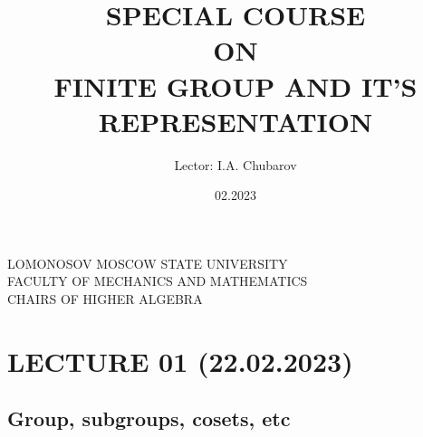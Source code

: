 \documentclass[12pt, a4paper]{article}
\theoremstyle{definition}
\begin{document}
\begin{spacing}{1.5}
\begin{center}
    {\fontsize{14}{16}\selectfont
    LOMONOSOV MOSCOW STATE UNIVERSITY\\
    FACULTY OF MECHANICS AND MATHEMATICS\\
    CHAIRS OF HIGHER ALGEBRA}
\end{center}
\begin{minipage}{\textwidth}
\title{
    \fontsize{24}{80}\selectfont \textbf{SPECIAL COURSE}\\
    \fontsize{14}{30}\selectfont ON\\
    \fontsize{16}{30}\selectfont \textbf{FINITE GROUP AND IT'S REPRESENTATION}\\
}
\author{Lector: I.A. Chubarov}
\date{02.2023}
\maketitle
\end{minipage}
\end{spacing}
\thispagestyle{empty}

\newpage
\tableofcontents
\thispagestyle{empty}
\newpage
\setcounter{page}{1}
\section{LECTURE 01 (22.02.2023)}
\subsection{Group, subgroups, cosets, etc}
\end{document}

